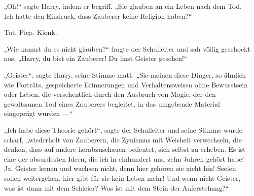 „Oh!“ sagte Harry, indem er begriff.
„Sie glauben an ein Leben nach dem Tod. Ich hatte den Eindruck, dass Zauberer keine Religion haben?“

\later

Tut. Piep. Klonk.

„Wie kannst du es nicht glauben?“ fragte der Schulleiter und sah völlig geschockt aus.
„Harry, du bist ein Zauberer! Du hast Geister gesehen!“

„Geister“, sagte Harry, seine Stimme matt.
„Sie meinen diese Dinger, so ähnlich wie Porträts, gespeicherte Erinnerungen und Verhaltensweisen ohne Bewusstsein oder Leben, die versehentlich durch den Ausbruch von Magie, der den gewaltsamen Tod eines Zauberers begleitet, in das umgebende Material eingeprägt wurden —“

„Ich habe diese Theorie gehört“, sagte der Schulleiter und seine Stimme wurde scharf, „wiederholt von Zauberern, die Zynismus mit Weisheit verwechseln, die denken, dass auf andere herabzuschauen bedeutet, sich selbst zu erheben. Es ist eine der absurdesten Ideen, die ich in einhundert und zehn Jahren gehört habe! Ja, Geister lernen und wachsen nicht, denn hier gehören sie nicht hin! Seelen sollen weitergehen, hier gibt für sie kein Leben mehr! Und wenn nicht Geister, was ist dann mit dem Schleier? Was ist mit dem Stein der Auferstehung?“

